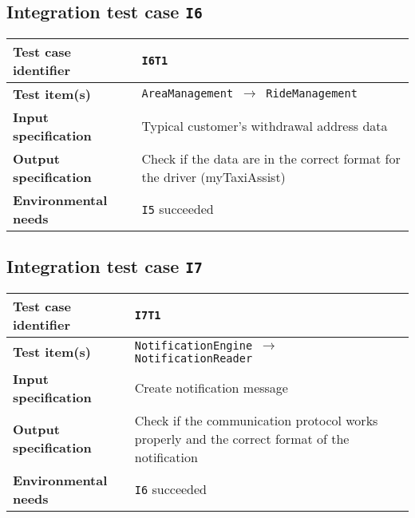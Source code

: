 \subsection{Integration test case \normalfont\texttt{I6}}\label{subsec:t6}

\begin{table*}[!h]\centering\begin{tabularx}{.9\textwidth}{ >{\bfseries}l X }\toprule%
Test case identifier	&	\texttt{I6T1}	\\\midrule
Test item(s)		&	\texttt{AreaManagement $\to$ RideManagement}	\\\midrule
Input specification	&	Typical customer's withdrawal address data	\\\midrule
Output specification	&	Check if the data are in the correct format for the driver (myTaxiAssist)	\\\midrule
Environmental needs	&	\texttt{I5} succeeded	\\
\bottomrule\end{tabularx}\end{table*}





\clearpage



\subsection{Integration test case \normalfont\texttt{I7}}\label{subsec:t7}

\begin{table*}[!h]\centering\begin{tabularx}{.9\textwidth}{ >{\bfseries}l X }\toprule%
Test case identifier	&	\texttt{I7T1}	\\\midrule
Test item(s)		&	\texttt{NotificationEngine $\to$ NotificationReader}	\\\midrule
Input specification	&	Create notification message	\\\midrule
Output specification	&	Check if the communication protocol works properly and the correct format of the notification	\\\midrule
Environmental needs	&	\texttt{I6} succeeded	\\
\bottomrule\end{tabularx}\end{table*}





